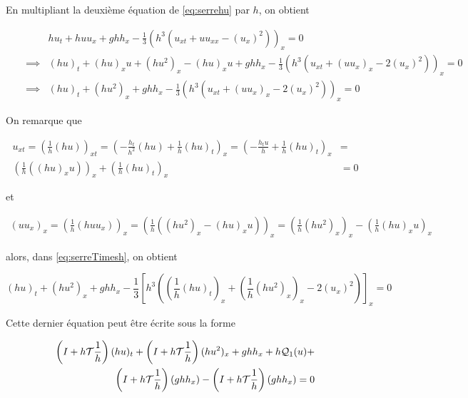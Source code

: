 \indent En multipliant la deuxième équation de \eqref{eq:serrehu} par $h$, on obtient

\begin{equation}
	\label{eq:serreTimesh}
	\begin{aligned}
		&& & hu_t + huu_x + ghh_x - \frac{1}{3}\left(h^3 \left( u_{xt} + uu_{xx} - (u_x)^2  \right) \right)_x = 0 \\
		&& \implies & (hu)_t +  (hu)_xu + (hu^2)_x - (hu)_xu + ghh_x - \frac{1}{3}\left(h^3 \left( u_{xt} + (uu_x)_x - 2(u_x)^2  \right) \right)_x = 0  \\
		&& \implies & (hu)_t +  (hu^2)_x  + ghh_x - \frac{1}{3}\left(h^3 \left( u_{xt} + (uu_x)_x - 2(u_x)^2  \right) \right)_x = 0 
	\end{aligned}
\end{equation}

\indent On remarque que

\begin{equation*}
	\begin{split}
	u_{xt} = \left(\frac{1}{h} (hu) \right)_{xt} = \left( -\frac{h_t}{h^2}(hu) + \frac{1}{h}(hu)_t  \right)_x = \left( -\frac{h_tu}{h} + \frac{1}{h}(hu)_t  \right)_x &= \\ \left( \frac{1}{h} ((hu)_xu) \right)_x  + \left( \frac{1}{h}(hu)_t  \right)_x &=0
	\end{split}
\end{equation*}

\noindent et

\begin{equation*}
	\begin{split}
	(uu_x)_x = \left(  \frac{1}{h} (huu_x) \right)_x = \left(  \frac{1}{h} ((hu^2)_x - (hu)_xu) \right)_x = \left( \frac{1}{h} (hu^2)_x \right)_x - \left( \frac{1}{h} (hu)_xu \right)_x
	\end{split}
\end{equation*}

\noindent alors, dans \eqref{eq:serreTimesh}, on obtient

\begin{equation*}
	(hu)_t  + (hu^2)_x + ghh_x - \frac{1}{3}\left[h^3 \left( \left( \frac{1}{h}(hu)_t  \right)_x  + \left( \frac{1}{h} (hu^2)_x \right)_x  - 2(u_x)^2  \right) \right]_x = 0
\end{equation*}

\indent Cette dernier équation peut être écrite sous la forme

\begin{equation*}
\begin{split}
	\left(I + h\mathcal{T}\frac{1}{h} \right) (hu)_t + \left(I + h\mathcal{T}\frac{1}{h} \right)(hu^2)_x + ghh_x + h\mathcal{Q}_1(u) + \\ \left(I + h\mathcal{T}\frac{1}{h} \right) (ghh_x) - \left(I + h\mathcal{T}\frac{1}{h} \right) (ghh_x) = 0
\end{split}
\end{equation*}

